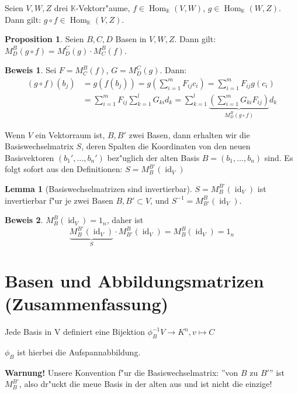 \documentclass[oneside,fontsize=11pt,paper=a4,BCOR=0mm,DIV=12,automark,headsepline]{scrbook}
\DeclareMathOperator{\mHom}{Hom}
\DeclareMathOperator{\mId}{id}
\theoremstyle{remark}
\theoremstyle{definition}
\newtheorem*{proposition}{Proposition}
\newtheorem{lemma}{Lemma}[section]
\theoremstyle{definition}
\newtheorem*{prof}{Beweis}
\theoremstyle{remark}
\begin{document}
Seien \(V, W, Z\) drei \(\mathbb{K}\)-Vektorr"aume, \(f \in \mHom_\mathbb{K}(V, W)\), \(g \in \mHom_\mathbb{K}(W,Z)\). Dann gilt: \(g\circ f \in \mHom_\mathbb{K}(V,Z)\).

\begin{proposition}
  Seien \(B,C,D\) Basen in
  \(V,W,Z\). Dann gilt: \(M^B_D(g\circ f) = M^C_D(g)\cdot M^B_C(f)\).
\end{proposition}
\begin{prof}
  Sei \(F = M^B_C(f)\), \(G = M^C_D(g)\). Dann:
  \begin{align*}
    (g\circ f)(b_j) &= g(f(b_j)) = g\left(\sum_{i=1}^m F_{ij}c_i\right) = \sum_{i=1}^mF_{ij}g(c_i) \\&= \sum_{i=1}^m F_{ij}\sum_{k=1}^lG_{ki}d_k = \sum_{k=1}^l\underbrace{\left(\sum_{i=1}^mG_{ki}F_{ij}\right)}_{M^B_D(g\circ f)}d_k
  \end{align*}
\end{prof}

Wenn \(V\) ein Vektorraum ist, \(B,B'\) zwei Basen, dann erhalten wir die
Basiswechselmatrix \(S\), deren Spalten die Koordinaten von den neuen
Basisvektoren \((b_1', \dots, b_n')\) bez"uglich der alten Basis \(B = (b_1,
\dots, b_n)\) sind. Es folgt sofort aus den Definitionen:
\(S=M^{B'}_B(\mId_V)\)

\begin{lemma}[Basiswechselmatrizen sind invertierbar]
  \(S = M^{B'}_B(\mId_V)\) ist invertierbar f"ur je zwei Basen \(B, B' \subset V\), und \(S^{-1} = M^B_{B'}(\mId_V)\).
\end{lemma}
\begin{prof}
  \(M^B_B(\mId_V)=1_n\), daher ist
  \[\underbrace{M^{B'}_B(\mId_V)}_{S}\cdot M^B_{B'}(\mId_V) = M^B_B(\mId_V) = 1_n \]
\end{prof}


\section{Basen und Abbildungsmatrizen (Zusammenfassung)}
\label{sec:baab}
Jede Basis in V definiert eine Bijektion $\phi_B^{-1}V\rightarrow K^n, v\mapsto C$
\begin{relation}
  $\phi_B$ ist hierbei die Aufspannabbildung.  
\end{relation}

\textbf{Warnung!} Unsere Konvention f"ur die Basiswechselmatrix: ''von $B$ zu
$B'$'' ist $M^{B'}_B$, also dr"uckt die meue Basis in der alten aus und ist
nicht die einzige!
\end{document}

